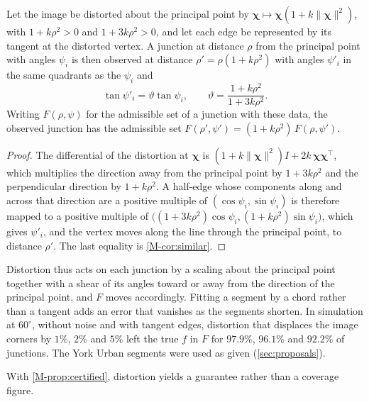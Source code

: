 \begin{proposition}\label{prop:distortion}
Let the image be distorted about the principal point by $\boldsymbol\chi\mapsto\boldsymbol\chi(1+k\|\boldsymbol\chi\|^2)$, with $1+k\rho^2>0$ and $1+3k\rho^2>0$, and let each edge be represented by its tangent at the distorted vertex. A junction at distance $\rho$ from the principal point with angles $\psi_i$ is then observed at distance $\rho'=\rho(1+k\rho^2)$ with angles $\psi'_i$ in the same quadrants as the $\psi_i$ and
\[
\tan\psi'_i=\vartheta\tan\psi_i,\qquad \vartheta=\frac{1+k\rho^2}{1+3k\rho^2}.
\]
Writing $F(\rho,\psi)$ for the admissible set of a junction with these data, the observed junction has the admissible set $F(\rho',\psi')=(1+k\rho^2)\,F(\rho,\psi')$.
\end{proposition}
\begin{proof}
The differential of the distortion at $\boldsymbol\chi$ is $(1+k\|\boldsymbol\chi\|^2)I+2k\,\boldsymbol\chi\boldsymbol\chi^{\top}$, which multiplies the direction away from the principal point by $1+3k\rho^2$ and the perpendicular direction by $1+k\rho^2$. A half-edge whose components along and across that direction are a positive multiple of $(\cos\psi_i,\sin\psi_i)$ is therefore mapped to a positive multiple of $\bigl((1+3k\rho^2)\cos\psi_i,(1+k\rho^2)\sin\psi_i\bigr)$, which gives $\psi'_i$, and the vertex moves along the line through the principal point, to distance $\rho'$. The last equality is \cref{M-cor:similar}.
\end{proof}

Distortion thus acts on each junction by a scaling about the principal point together with a shear of its angles toward or away from the direction of the principal point, and $F$ moves accordingly. Fitting a segment by a chord rather than a tangent adds an error that vanishes as the segments shorten. In simulation at $60^\circ$, without noise and with tangent edges, distortion that displaces the image corners by $1\%$, $2\%$ and $5\%$ left the true $f$ in $F$ for $97.9\%$, $96.1\%$ and $92.2\%$ of junctions. The York Urban segments were used as given (\cref{sec:proposals}).

With \cref{M-prop:certified}, distortion yields a guarantee rather than a coverage figure.

